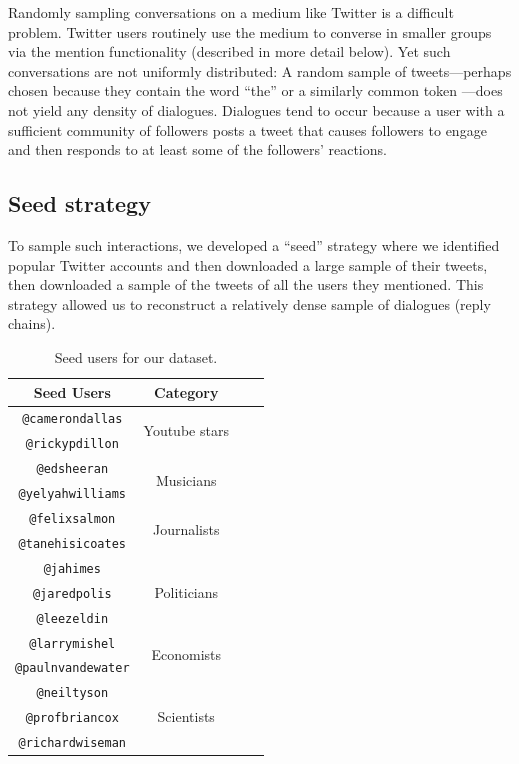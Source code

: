 \documentclass[11pt,letterpaper]{article}
\begin{document}
Randomly sampling conversations on a medium like Twitter is a difficult problem. Twitter users routinely use the medium to converse in smaller groups via the \@ mention functionality (described in more detail below). Yet such conversations are not uniformly distributed: A random sample of tweets---perhaps chosen because they contain the word ``the'' or a similarly common token \cite{doyle2014}---does not yield any density of dialogues. Dialogues tend to occur because a user with a sufficient community of followers posts a tweet that causes followers to engage and then responds to at least some of the followers' reactions. 

\subsection{Seed strategy}

To sample such interactions, we developed a ``seed'' strategy where we identified popular Twitter accounts and then downloaded a large sample of their tweets, then downloaded a sample of the tweets of all the users they mentioned. This strategy allowed us to reconstruct a relatively dense sample of dialogues (reply chains).

\begin{table}
\begin{center}
\begin{tabular}{|c|c|c|c|}
\hline
Seed Users & Category \\ %
\hline
{\tt @camerondallas} & \multirow{2}{*}{Youtube stars} \\
{\tt @rickypdillon} & \\
\hline
{\tt @edsheeran} & \multirow{2}{*}{Musicians} \\
{\tt @yelyahwilliams} & \\
\hline
{\tt @felixsalmon} & \multirow{2}{*}{Journalists} \\
{\tt @tanehisicoates} & \\
\hline
{\tt @jahimes} & \multirow{3}{*}{Politicians} \\
{\tt @jaredpolis} & \\
{\tt @leezeldin} & \\
\hline
{\tt @larrymishel} & \multirow{2}{*}{Economists} \\
{\tt @paulnvandewater} & \\
\hline
{\tt @neiltyson} & \multirow{3}{*}{Scientists} \\
{\tt @profbriancox} & \\
{\tt @richardwiseman} & \\
\hline
\end{tabular}
\end{center}
\caption{\label{tab:seed-users} Seed users for our dataset.}
\end{table}
\end{document}
